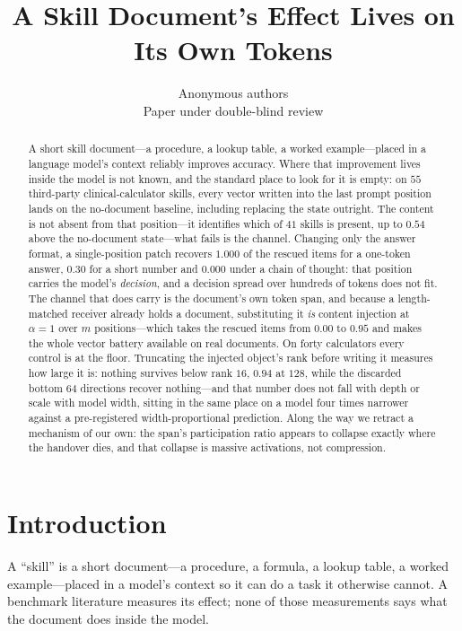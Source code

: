 \documentclass{article}
\title{A Skill Document's Effect Lives on Its Own Tokens}
\author{Anonymous authors \\
Paper under double-blind review}
\begin{document}
\maketitle

\begin{abstract}
A short skill document---a procedure, a lookup table, a worked example---placed
in a language model's context reliably improves accuracy. Where that improvement
lives inside the model is not known, and the standard place to look for it is
empty: on $55$ third-party clinical-calculator skills, every vector written into
the last prompt position lands on the no-document baseline, including replacing
the state outright. The content is not absent from that position---it identifies
which of $41$ skills is present, up to $0.54$ above the no-document state---what
fails is the channel. Changing only the answer format, a single-position patch
recovers $1.000$ of the rescued items for a one-token answer, $0.30$ for a short
number and $\mathbf{0.000}$ under a chain of thought: that position carries the
model's \emph{decision}, and a decision spread over hundreds of tokens does not
fit. The channel that does carry is the document's own token span, and because a
length-matched receiver already holds a document, substituting it \emph{is}
content injection at $\alpha=1$ over $m$ positions---which takes the rescued
items from $0.00$ to $0.95$ and makes the whole vector battery available on real
documents. On forty calculators every control is at the floor.
Truncating the injected object's rank before writing it measures how large it
is: nothing survives below rank $16$, $0.94$ at $128$, while the discarded
bottom $64$ directions recover nothing---and that number does not fall with
depth or scale with model width, sitting in the same place on a model four times narrower
against a pre-registered width-proportional prediction. Along the way we retract
a mechanism of our own: the span's participation ratio appears to collapse
exactly where the handover dies, and that collapse is massive activations, not
compression.
\end{abstract}

\section{Introduction}

A ``skill'' is a short document---a procedure, a formula, a lookup table, a
worked example---placed in a model's context so it can do a task it otherwise
cannot. A benchmark literature measures its effect; none of those measurements
says what the document does inside the model.
\end{document}
